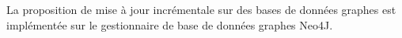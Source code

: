 La proposition de mise à jour incrémentale sur des bases de données graphes est implémentée sur le gestionnaire de base de données graphes Neo4J.

